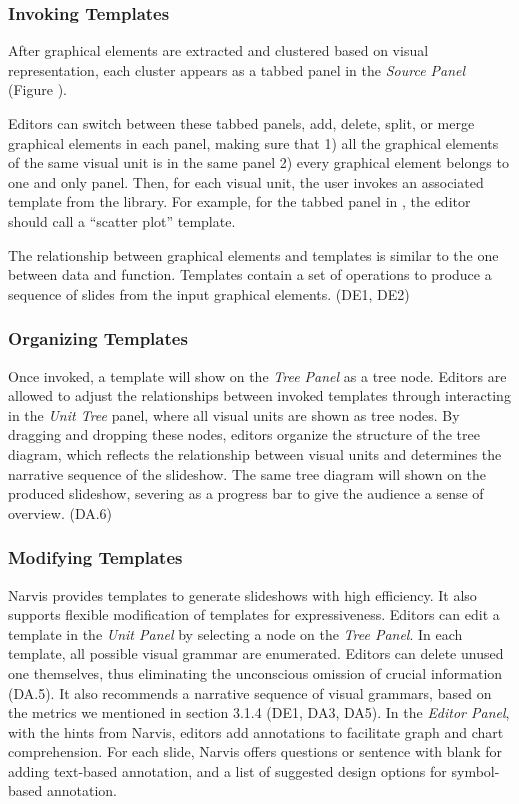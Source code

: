 \subsubsection{Invoking Templates} 

After graphical elements are extracted and clustered based on visual representation, each cluster appears as a tabbed panel in the \textit{Source Panel} (Figure ). 

Editors can switch between these tabbed panels, add, delete, split, or merge graphical elements in each panel, making sure that 1) all the graphical elements of the same visual unit is in the same panel 2) every graphical element belongs to one and only panel. Then, for each visual unit, the user invokes an associated template from the library. For example, for the tabbed panel in , the editor should call a ``scatter plot'' template.

The relationship between graphical elements and templates is similar to the one between data and function. Templates contain a set of operations to produce a sequence of slides from the input graphical elements.  (DE1, DE2) 

\subsubsection{Organizing Templates} 
Once invoked, a template will show on the \textit{Tree Panel} as a tree node. 
Editors are allowed to adjust the relationships between invoked templates through interacting in the \textit{Unit Tree} panel, where all visual units are shown as tree nodes.
By dragging and dropping these nodes, editors organize the structure of the tree diagram, which reflects the relationship between visual units and determines the narrative sequence of the slideshow. The same tree diagram will shown on the produced slideshow, severing as a progress bar to give the audience a sense of overview. (DA.6)

\subsubsection{Modifying Templates} 
Narvis provides templates to generate slideshows with high efficiency. 
It also supports flexible modification of templates for expressiveness.
Editors can edit a template in the \textit{Unit Panel} by selecting a node on the \textit{Tree Panel}. In each template, all possible visual grammar are enumerated. Editors can delete unused one themselves, thus eliminating the unconscious omission of crucial information (DA.5). It also recommends a narrative sequence of visual grammars, based on the metrics we mentioned in section 3.1.4 (DE1, DA3, DA5). 
In the \textit{Editor Panel}, with the hints from Narvis, editors add annotations to facilitate graph and chart comprehension. For each slide, Narvis offers questions or sentence with blank for adding text-based annotation, and a list of suggested design options for symbol-based annotation. 


